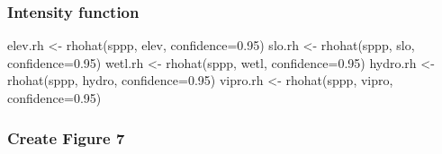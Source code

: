 \documentclass[
]{article}
\newenvironment{Shaded}{\begin{snugshade}}{\end{snugshade}}
\newcommand{\AttributeTok}[1]{\textcolor[rgb]{0.77,0.63,0.00}{#1}}
\newcommand{\FloatTok}[1]{\textcolor[rgb]{0.00,0.00,0.81}{#1}}
\newcommand{\FunctionTok}[1]{\textcolor[rgb]{0.00,0.00,0.00}{#1}}
\newcommand{\NormalTok}[1]{#1}
\newcommand{\OtherTok}[1]{\textcolor[rgb]{0.56,0.35,0.01}{#1}}
\begin{document}
\hypertarget{intensity-function}{%
\subsubsection{Intensity function}\label{intensity-function}}

\begin{Shaded}
\begin{Highlighting}[]
\NormalTok{elev.rh }\OtherTok{\textless{}{-}} \FunctionTok{rhohat}\NormalTok{(sppp, elev, }\AttributeTok{confidence=}\FloatTok{0.95}\NormalTok{)}
\NormalTok{slo.rh }\OtherTok{\textless{}{-}} \FunctionTok{rhohat}\NormalTok{(sppp, slo, }\AttributeTok{confidence=}\FloatTok{0.95}\NormalTok{)}
\NormalTok{wetl.rh }\OtherTok{\textless{}{-}} \FunctionTok{rhohat}\NormalTok{(sppp, wetl, }\AttributeTok{confidence=}\FloatTok{0.95}\NormalTok{)}
\NormalTok{hydro.rh }\OtherTok{\textless{}{-}} \FunctionTok{rhohat}\NormalTok{(sppp, hydro, }\AttributeTok{confidence=}\FloatTok{0.95}\NormalTok{)}
\NormalTok{vipro.rh }\OtherTok{\textless{}{-}} \FunctionTok{rhohat}\NormalTok{(sppp, vipro, }\AttributeTok{confidence=}\FloatTok{0.95}\NormalTok{)}
\end{Highlighting}
\end{Shaded}

\hypertarget{create-figure-7}{%
\subsubsection{Create Figure 7}\label{create-figure-7}}
\end{document}
